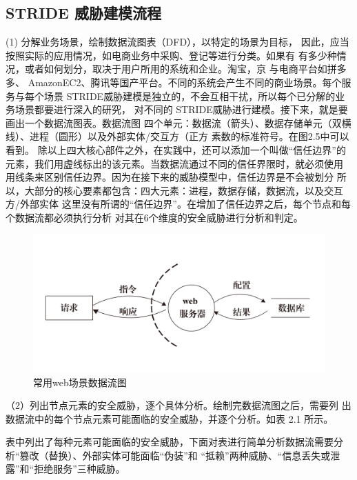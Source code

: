\subsection{STRIDE 威胁建模流程}
(1) 分解业务场景，绘制数据流图表（DFD），以特定的场景为目标，
因此，应当按照实际的应用情况，如电商业务中采购、登记等进行分类。如果有
有多少种情况，或者如何划分，取决于用户所用的系统和企业。淘宝，京
与电商平台如拼多多、 AmazonEC2、腾讯等国产平台。不同的系统会产生不同的商业场景。每个服务与每个场景
STRIDE威胁建模是独立的，不会互相干扰，所以每个已分解的业务场景都要进行深入的研究，
对不同的 STRIDE威胁进行建模。接下来，就是要画出一个数据流图表。数据流图
四个单元：数据流（箭头）、数据存储单元（双横线）、进程（圆形）以及外部实体/交互方（正方
素数的标准符号。在图2.5中可以看到。
除以上四大核心部件之外，在实践中，还可以添加一个叫做“信任边界”的元素，我们用虚线标出的该元素。当数据流通过不同的信任界限时，就必须使用
用线条来区别信任边界。因为在接下来的威胁模型中，信任边界是不会被划分
所以，大部分的核心要素都包含：四大元素：进程，数据存储，数据流，以及交互方/外部实体
这里没有所谓的“信任边界”。在增加了信任边界之后，每个节点和每个数据流都必须执行分析
对其在6个维度的安全威胁进行分析和判定。

\begin{figure}
    \centering
    \includegraphics[scale=0.4]{resources/img/i7.jpg}
    \caption{常用web场景数据流图}
  \end{figure}
  （2）列出节点元素的安全威胁，逐个具体分析。绘制完数据流图之后，需要列
  出数据流中的每个节点元素可能面临的安全威胁，并逐个分析。如表 2.1 所示。

  表中列出了每种元素可能面临的安全威胁，下面对表进行简单分析数据流需要分析“篡改（替换）、外部实体可能面临“伪装”和
  “抵赖”两种威胁、“信息丢失或泄露”和“拒绝服务”三种威胁。

